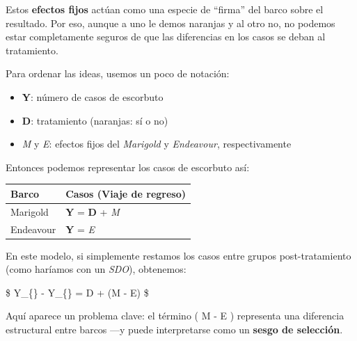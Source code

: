 \documentclass[
  letterpaper,
  DIV=11,
  numbers=noendperiod,
  oneside]{scrreprt}
\providecommand{\tightlist}{%
  \setlength{\itemsep}{0pt}\setlength{\parskip}{0pt}}\usepackage{longtable,booktabs,array}
\begin{document}
Estos \textbf{efectos fijos} actúan como una especie de ``firma'' del
barco sobre el resultado. Por eso, aunque a uno le demos naranjas y al
otro no, no podemos estar completamente seguros de que las diferencias
en los casos se deban al tratamiento.

Para ordenar las ideas, usemos un poco de notación:

\begin{itemize}
\tightlist
\item
  \textbf{Y}: número de casos de escorbuto\\
\item
  \textbf{D}: tratamiento (naranjas: sí o no)\\
\item
  \emph{M} y \emph{E}: efectos fijos del \emph{Marigold} y
  \emph{Endeavour}, respectivamente
\end{itemize}

Entonces podemos representar los casos de escorbuto así:

\begin{longtable}[]{@{}ll@{}}
\toprule()
Barco & Casos (Viaje de regreso) \\
\midrule()
\endhead
Marigold & \textbf{Y} = \textbf{D} + \emph{M} \\
Endeavour & \textbf{Y} = \emph{E} \\
\bottomrule()
\end{longtable}

En este modelo, si simplemente restamos los casos entre grupos
post-tratamiento (como haríamos con un \emph{SDO}), obtenemos:

\$ Y\_\{\} - Y\_\{\} = D + (M - E) \$

Aquí aparece un problema clave: el término ( M - E ) representa una
diferencia estructural entre barcos ---y puede interpretarse como un
\textbf{sesgo de selección}.
\end{document}
